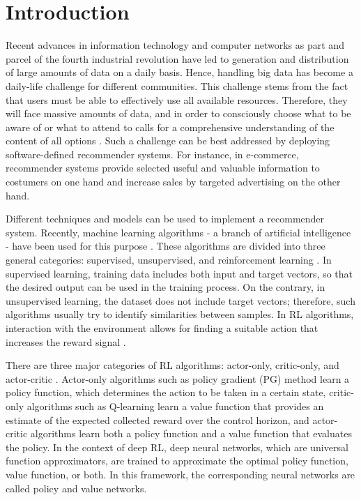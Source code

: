\documentclass[journal]{IEEEtran}
\begin{document}
\section{Introduction}\label{sec:introduction}

Recent advances in information technology and computer networks as part and parcel of the fourth industrial revolution have led to generation and distribution of large amounts of data on a daily basis. Hence, handling big data has become a daily-life challenge for different communities. This challenge stems from the fact that users must be able to effectively use all available resources. Therefore, they will face massive amounts of data, and in order to consciously choose what to be aware of or what to attend to calls for a comprehensive understanding of the content of all options \cite{batmaz2019review}. Such a challenge can be best addressed by deploying software-defined recommender systems. For instance, in e-commerce, recommender systems provide selected useful and valuable information to costumers on one hand and increase sales by targeted advertising on the other hand.

Different techniques and models can be used to implement a recommender system. Recently, machine learning algorithms - a branch of artificial intelligence - have been used for this purpose \cite{lampropoulos2015machine}. These algorithms are divided into three general categories: supervised, unsupervised, and reinforcement learning \cite{portugal2018use}. In supervised learning, training data includes both input and target vectors, so that the desired output can be used in the training process. On the contrary, in unsupervised learning, the dataset does not include target vectors; therefore, such algorithms usually try to identify similarities between samples. In RL algorithms, interaction with the environment allows for finding a suitable action that increases the reward signal \cite{bishop2006pattern}.  

There are three major categories of RL algorithms: actor-only, critic-only, and actor-critic \cite{Grondman2012}. Actor-only algorithms such as policy gradient (PG) method learn a policy function, which determines the action to be taken in a certain state, critic-only algorithms such as Q-learning learn a value function that provides an estimate of the expected collected reward over the control horizon, and actor-critic algorithms learn both a policy function and a value function that evaluates the policy. In the context of deep RL, deep neural networks, which are universal function approximators, are trained to approximate the optimal policy function, value function, or both. In this framework, the corresponding neural networks are called policy and value networks. 
\end{document}
